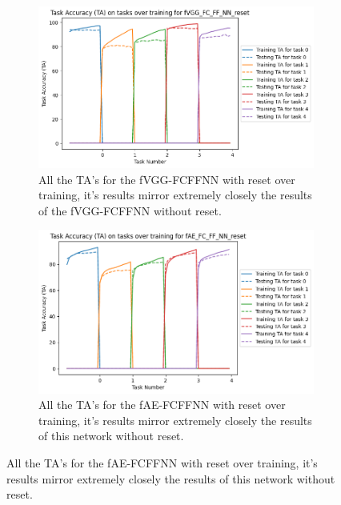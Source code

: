 \begin{figure}[ht]
  \centering
  \begin{subfigure}[t]{0.4\textwidth}
     \includegraphics[width=\linewidth]{images/CIFAR10_CL/fVGG_FC_FF_NN_reset_TA_task.png}
     \caption{All the TA's for the fVGG-FCFFNN with reset over training, it's results mirror extremely closely the results of the fVGG-FCFFNN without reset.}
  \end{subfigure}
  \quad
  \begin{subfigure}[t]{0.4\textwidth}
     \includegraphics[width=\linewidth]{images/CIFAR10_CL/fAE_FC_FF_NN_reset_TA_task.png}
     \caption{All the TA's for the fAE-FCFFNN with reset over training, it's results mirror extremely closely the results of this network without reset.}
  \end{subfigure}
  
  \medskip %


\end{figure}
